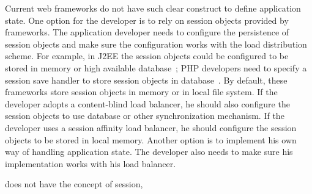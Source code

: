 Current web frameworks do not have such clear construct to define application state.
One option for the developer is to rely on session objects provided by frameworks.
The application developer needs to configure the persistence  of session objects 
and make sure the configuration works with the load distribution scheme.
For example, in J2EE the session objects could be configured to be stored in memory or
high available database~\cite{j2eedoc}; 
PHP developers need to specify a session save handler to store session objects 
in database~\cite{phpdoc}.
By default, these frameworks store session objects in memory or in local file system.
If the developer adopts a content-blind load balancer, 
he should also configure the session objects to use database or other
synchronization mechanism.
If the developer uses a session affinity load balancer,
he should configure the session objects to be stored in local memory.
Another option is to implement his own way of handling application state.
The developer also needs to make sure his implementation works with
his load balancer.

\cb{} does not have the concept of session,





\webscaleout{}